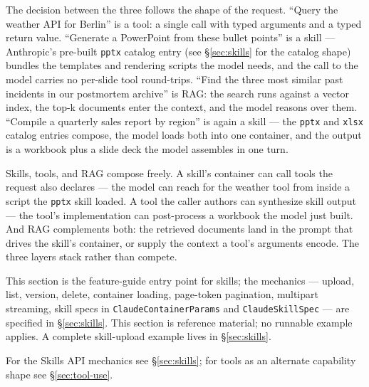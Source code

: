 \documentclass[a4paper,10pt,fleqn]{article}
\begin{document}
The decision between the three follows the shape of the request.
``Query the weather API for Berlin'' is a tool: a single call with
typed arguments and a typed return value.  ``Generate a PowerPoint
from these bullet points'' is a skill --- Anthropic's pre-built
\texttt{pptx} catalog entry (see §\ref{sec:skills} for the catalog
shape) bundles the templates and rendering scripts the model needs,
and the call to the model carries no per-slide tool round-trips.
``Find the three most similar past incidents in our postmortem
archive'' is RAG: the search runs against a vector index, the top-k
documents enter the context, and the model reasons over them.
``Compile a quarterly sales report by region'' is again a skill ---
the \texttt{pptx} and \texttt{xlsx} catalog entries compose, the
model loads both into one container, and the output is a workbook
plus a slide deck the model assembles in one turn.

Skills, tools, and RAG compose freely.  A skill's container can
call tools the request also declares --- the model can reach for the
weather tool from inside a script the \texttt{pptx} skill loaded.
A tool the caller authors can synthesize skill output --- the tool's
implementation can post-process a workbook the model just built.
And RAG complements both: the retrieved documents land in the prompt
that drives the skill's container, or supply the context a tool's
arguments encode.  The three layers stack rather than compete.

This section is the feature-guide entry point for skills; the
mechanics --- upload, list, version, delete, container loading,
page-token pagination, multipart streaming, skill specs in
\texttt{ClaudeContainerParams} and \texttt{ClaudeSkillSpec} ---
are specified in \S\ref{sec:skills}.  This section is reference
material; no runnable example applies.  A complete skill-upload
example lives in \S\ref{sec:skills}.

For the Skills API mechanics see \S\ref{sec:skills}; for tools
as an alternate capability shape see \S\ref{sec:tool-use}.

\medskip
\begin{sloppypar}
\end{sloppypar}
\end{document}
